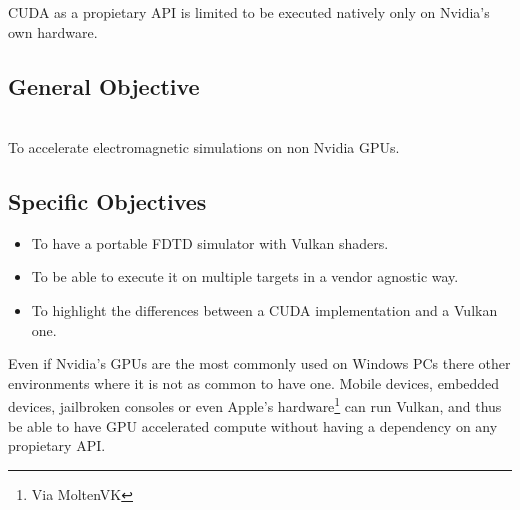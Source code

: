 \documentclass[../main.tex]{subfiles}
\begin{document}
\newpage
{}

CUDA as a propietary API is limited to be executed natively only on Nvidia's own hardware.


\subsection*{General Objective} \hspace{0pt} \\
To accelerate electromagnetic simulations on non Nvidia GPUs.

\subsection*{Specific Objectives}
\begin{itemize}
	\item To have a portable FDTD simulator with Vulkan shaders.
	\item To be able to execute it on multiple targets in a vendor agnostic way.
	\item To highlight the differences between a CUDA implementation and a Vulkan one.
\end{itemize}

Even if Nvidia's GPUs are the most commonly used on Windows PCs\citep{steam_hardware} there other environments where it is not as common to have one.
Mobile devices, embedded devices, jailbroken consoles or even Apple's hardware\footnote{Via MoltenVK} can run Vulkan, and thus be able to have GPU accelerated compute without having a dependency on any propietary API.
\end{document}
